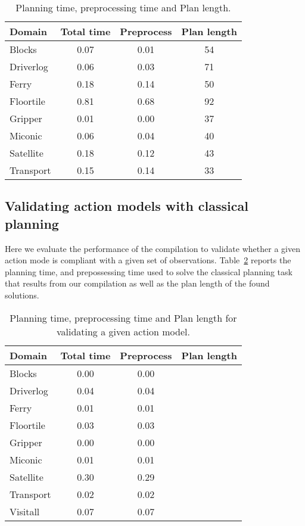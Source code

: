 \documentclass[letterpaper]{article} %
\begin{document}
\begin{table}[hbt!]
\begin{small}
	\begin{center}
		\begin{tabular}{l|c|c|c|}			 
			Domain & Total time & Preprocess & Plan length  \\
			\hline
			Blocks & 0.07 & 0.01 & 54  \\
			Driverlog & 0.06 & 0.03 & 71 \\
			Ferry & 0.18 & 0.14 & 50 \\
			Floortile & 0.81 & 0.68 & 92 \\
			Gripper & 0.01 & 0.00 & 37 \\
			Miconic & 0.06 & 0.04 & 40  \\
			Satellite & 0.18 & 0.12 & 43 \\
			Transport & 0.15 & 0.14 & 33 \\
		\end{tabular}
	\end{center}
        \end{small}
	\caption{\small Planning time, preprocessing time and Plan length.}
	\label{tab:time_plans_partial}	
\end{table}



\subsection{Validating action models with classical planning}
Here we evaluate the performance of the compilation to validate whether a given action mode is compliant with a given set of observations. Table~\ref{tab:time_plans_val} reports the planning time, and prepossessing time used to solve the classical planning task that results from our compilation as well as the plan length of the found solutions.
\begin{table}[hbt!]
\begin{small}
	\begin{center}
		\begin{tabular}{l|c|c|r|}			 
			Domain & Total time & Preprocess & Plan length  \\
			\hline
	                Blocks & 0.00 & 0.00 \\
			Driverlog & 0.04 & 0.04 \\
			Ferry & 0.01 & 0.01 \\
			Floortile & 0.03 & 0.03 \\
			Gripper & 0.00 & 0.00 \\
			Miconic & 0.01 & 0.01 \\
			Satellite & 0.30 & 0.29 \\
			Transport & 0.02 & 0.02 \\
			Visitall & 0.07 & 0.07  \\ 			
		\end{tabular}
	\end{center}
        \end{small}
	\caption{\small Planning time, preprocessing time and Plan length for validating a given action model.}
	\label{tab:time_plans_val}	
\end{table}
\end{document}
